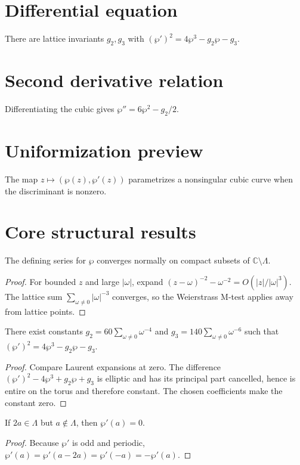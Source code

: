 \section{Differential equation}
There are lattice invariants $g_2,g_3$ with $(\wp')^2=4\wp^3-g_2\wp-g_3$.

\section{Second derivative relation}
Differentiating the cubic gives $\wp''=6\wp^2-g_2/2$.

\section{Uniformization preview}
The map $z\mapsto(\wp(z),\wp'(z))$ parametrizes a nonsingular cubic curve when the discriminant is nonzero.

\section{Core structural results}

\begin{theorem}\label{thm:iv29-01}
The defining series for $\wp$ converges normally on compact subsets of $\mathbb C\setminus\Lambda$.
\begin{proof}
For bounded $z$ and large $|\omega|$, expand $(z-\omega)^{-2}-\omega^{-2}=O(|z|/|\omega|^3)$. The lattice sum $\sum_{\omega\ne0}|\omega|^{-3}$ converges, so the Weierstrass M-test applies away from lattice points.
\end{proof}
\end{theorem}

\begin{theorem}\label{thm:iv29-02}
There exist constants $g_2=60\sum_{\omega\ne0}\omega^{-4}$ and $g_3=140\sum_{\omega\ne0}\omega^{-6}$ such that $(\wp')^2=4\wp^3-g_2\wp-g_3$.
\begin{proof}
Compare Laurent expansions at zero. The difference $(\wp')^2-4\wp^3+g_2\wp+g_3$ is elliptic and has its principal part cancelled, hence is entire on the torus and therefore constant. The chosen coefficients make the constant zero.
\end{proof}
\end{theorem}

\begin{theorem}\label{thm:iv29-03}
If $2a\in\Lambda$ but $a\notin\Lambda$, then $\wp'(a)=0$.
\begin{proof}
Because $\wp'$ is odd and periodic, $\wp'(a)=\wp'(a-2a)=\wp'(-a)=-\wp'(a)$.
\end{proof}
\end{theorem}

